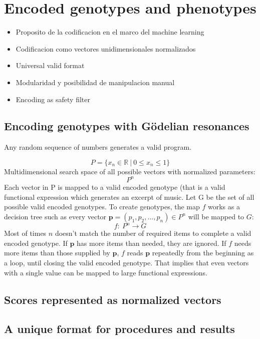 \documentclass{article}
\renewcommand{\vec}[1]{\mathbf{#1}}
\begin{document}


\section{Encoded genotypes and phenotypes}

\begin{itemize}
\item Proposito de la codificacion en el marco del machine learning
\item Codificacion como vectores unidimensionales normalizados
\item Universal valid format
\item Modularidad y posibilidad de manipulacion manual
\item Encoding as safety filter

\end{itemize}
\subsection{Encoding genotypes with G{\"o}delian resonances}

Any random sequence of numbers generates a valid program. 

$$ P = \{x_n \in \mathbb{R} \: | \: 0 \leq x_n \leq1 \} $$
Multidimensional search space of all possible vectors with normalized parameters:
$$ P^n $$
Each vector in P is mapped to a valid encoded genotype (that is a valid functional expression which generates an excerpt of music.
Let G be the set of all possible valid encoded genotypes. To create genotypes, the map $f$ works as a decision tree such as every vector $\vec{p} = (p_1, p_2, ..., p_n) \in P^n$ will be mapped to $G$: 
$$f:\ P^n\to G$$
Most of times $n$ doesn't match the number of required items to complete a valid encoded genotype. If $\vec{p}$ has more items than needed, they are ignored. If $f$ needs more items than those supplied by $\vec{p}$, $f$ reads $\vec{p}$ repeatedly from the beginning as a loop, until closing the valid encoded genotype. That implies that even vectors with a single value can be mapped to large functional expressions.  



\subsection{Scores represented as normalized vectors}
\subsection{A unique format for procedures and results}
\end{document}
